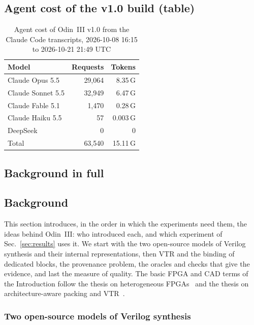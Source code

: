 \documentclass[conference]{IEEEtran}
\begin{document}
\subsection{Agent cost of the v1.0 build (table)}

\begin{table}[t]
\caption{Agent cost of Odin~III v1.0 from the Claude Code transcripts, 2026-10-08 16:15 to 2026-10-21 21:49 UTC}
\label{tab:cost}
\centering
\footnotesize
\begin{tabular}{@{}lrr@{}}
\toprule
Model & Requests & Tokens \\
\midrule
Claude Opus 5.5 & 29,064 & 8.35\,G \\
Claude Sonnet 5.5 & 32,949 & 6.47\,G \\
Claude Fable 5.1 & 1,470 & 0.28\,G \\
Claude Haiku 5.5 & 57 & 0.003\,G \\
DeepSeek & 0 & 0 \\
\midrule
Total & 63,540 & 15.11\,G \\
\bottomrule
\end{tabular}
\end{table}

\subsection{Background in full}

\subsection*{Background}


This section introduces, in the order in which the experiments need them, the ideas behind Odin~III: who introduced each, and which experiment of Sec.~\ref{sec:results} uses it. We start with the two open-source models of Verilog synthesis and their internal representations, then VTR and the binding of dedicated blocks, the provenance problem, the oracles and checks that give the evidence, and last the measure of quality. The basic FPGA and CAD terms of the Introduction follow the thesis on heterogeneous FPGAs~ and the thesis on architecture-aware packing and VTR~.

\subsubsection*{Two open-source models of Verilog synthesis}
\end{document}

